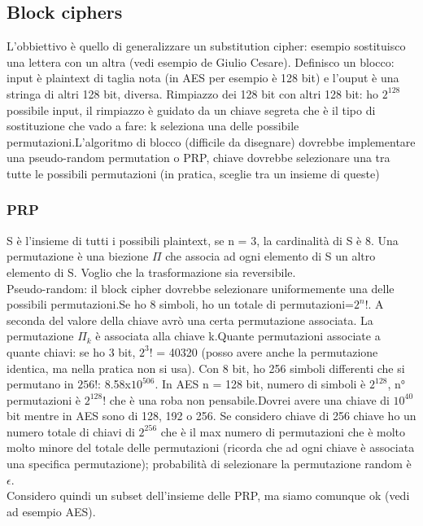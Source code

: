 \documentclass[16px]{article}
\begin{document}
\subsection{Block ciphers}
L'obbiettivo è quello di generalizzare un substitution cipher: esempio sostituisco una lettera con un altra (vedi esempio de Giulio Cesare). Definisco un blocco: input è plaintext di taglia nota (in AES per esempio è 128 bit) e l'ouput è una stringa di altri 128 bit, diversa. Rimpiazzo dei 128 bit con altri 128 bit: ho $2^{128}$ possibile input, il rimpiazzo è guidato da un chiave segreta che è il tipo di sostituzione che vado a fare: k seleziona una delle possibile permutazioni.L'algoritmo di blocco (difficile da disegnare) dovrebbe implementare una pseudo-random permutation o PRP, chiave dovrebbe selezionare una tra tutte le possibili permutazioni (in pratica, sceglie tra un insieme di queste)
\subsubsection{PRP}
S è l'insieme di tutti i possibili plaintext, se n = 3, la cardinalità di S è 8. Una permutazione è una biezione $\Pi$ che associa ad ogni elemento di S un altro elemento di S. Voglio che la trasformazione sia reversibile.\\ Pseudo-random: il block cipher dovrebbe selezionare uniformemente una delle possibili permutazioni.Se ho 8 simboli, ho un totale di permutazioni=$2^{n}!$. A seconda del valore della chiave avrò una certa permutazione associata. La permutazione $\Pi_k$ è associata alla chiave k.Quante permutazioni associate a quante chiavi: se ho 3 bit, $2^{3}!$ = 40320 (posso avere anche la permutazione identica, ma nella pratica non si usa). Con 8 bit, ho 256 simboli differenti che si permutano in $256!$: 8.58x$10^506$. In AES n = 128 bit, numero di simboli è $2^{128}$, n° permutazioni è $2^{128}!$ che è una roba non pensabile.Dovrei avere una chiave di $10^{40}$ bit mentre in AES sono di 128, 192 o 256. Se considero chiave di 256 chiave ho un numero totale di chiavi di $2^{256}$ che è il max numero di permutazioni che è molto molto minore del totale delle permutazioni (ricorda che ad ogni chiave è associata una specifica permutazione); probabilità di selezionare la permutazione random è $\epsilon$.\\ Considero quindi un subset dell'insieme delle PRP, ma siamo comunque ok (vedi ad esempio AES).
\end{document}
